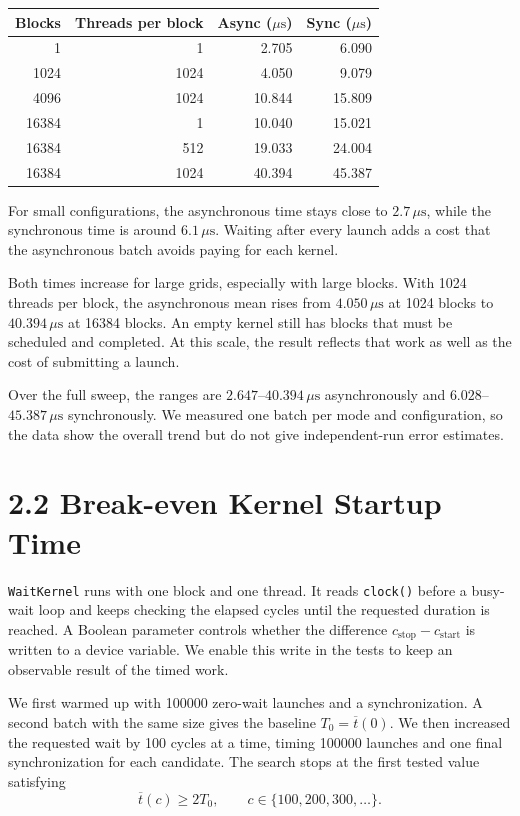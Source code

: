 \documentclass[11pt,a4paper]{article}
\newcommand{\us}{\,\mu\mathrm{s}}
\newcommand{\code}[1]{\texttt{#1}}
\begin{document}
\begin{center}
\small
\begin{tabular}{@{}rrrr@{}}
\toprule
Blocks & Threads per block & Async (\(\mu\mathrm{s}\)) & Sync (\(\mu\mathrm{s}\)) \\
\midrule
1     & 1    & 2.705  & 6.090 \\
1024  & 1024 & 4.050  & 9.079 \\
4096  & 1024 & 10.844 & 15.809 \\
16384 & 1    & 10.040 & 15.021 \\
16384 & 512  & 19.033 & 24.004 \\
16384 & 1024 & 40.394 & 45.387 \\
\bottomrule
\end{tabular}
\end{center}

For small configurations, the asynchronous time stays close to \(2.7\us\),
while the synchronous time is around \(6.1\us\). Waiting after every launch
adds a cost that the asynchronous batch avoids paying for each kernel.

Both times increase for large grids, especially with large blocks. With 1024
threads per block, the asynchronous mean rises from \(4.050\us\) at 1024
blocks to \(40.394\us\) at 16384 blocks. An empty kernel still has blocks
that must be scheduled and completed. At this scale, the result reflects that
work as well as the cost of submitting a launch.

Over the full sweep, the ranges are \(2.647\)--\(40.394\us\) asynchronously
and \(6.028\)--\(45.387\us\) synchronously. We measured one batch per mode
and configuration, so the data show the overall trend but do not give
independent-run error estimates.

\clearpage
\section*{2.2 Break-even Kernel Startup Time}

\code{WaitKernel} runs with one block and one thread. It reads \code{clock()}
before a busy-wait loop and keeps checking the elapsed cycles until the
requested duration is reached. A Boolean parameter controls whether the
difference \(c_{\mathrm{stop}}-c_{\mathrm{start}}\) is written to a device
variable. We enable this write in the tests to keep an observable result of
the timed work.

We first warmed up with 100000 zero-wait launches and a synchronization. A
second batch with the same size gives the baseline
\(T_0=\overline{t}(0)\). We then increased the requested wait by 100 cycles
at a time, timing 100000 launches and one final synchronization for each
candidate. The search stops at the first tested value satisfying
\[
    \overline{t}(c)\geq 2T_0,
    \qquad c\in\{100,200,300,\ldots\}.
\]
\end{document}
